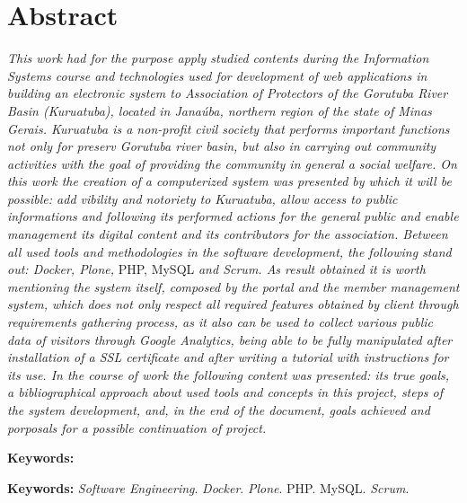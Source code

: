 \chapter*{Abstract}
\vspace{0.4cm}
\noindent \textit{This work had for  the purpose apply studied contents during the Information Systems course and technologies  used for development of web applications   in building an electronic system to Association of Protectors of the Gorutuba River Basin (Kuruatuba), located in Janaúba, northern region of the state of Minas Gerais. 
Kuruatuba is a 
non-profit civil society that performs important functions not only for preserv Gorutuba river basin, but also in carrying out community activities with the goal of providing the community in general a social welfare.
On this work the creation of a computerized system was presented by which it will be possible: add vibility and notoriety to Kuruatuba, allow access to public informations and following its performed actions for the general public and enable management its digital content and its contributors for the association.
Between all used tools and methodologies in the software development, the following stand out: Docker, Plone,} PHP, MySQL \textit{and Scrum.
As result obtained it is worth mentioning the system itself, composed by the portal and the member management system, which does not only respect all required features obtained by client through requirements gathering process, as it also can be used to collect various public data of visitors through Google Analytics, being able to be fully manipulated after installation of a SSL certificate and after writing a tutorial with instructions for its use.
In the course of work the following content was presented: its true goals, a bibliographical approach about used tools and concepts in this project, steps of the system development, and, in the end of the document, goals achieved and porposals for a possible continuation of project.}

\begin{labeling}{\textbf{Keywords:}}
\item[\textbf{Keywords:}] 
\textit{Software Engineering}.
\textit{Docker}.
\textit{Plone}.
PHP.
MySQL.
\textit{Scrum}.
\end{labeling}

